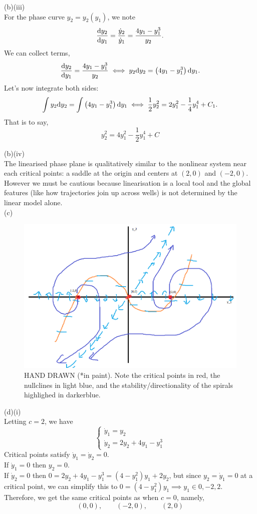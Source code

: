 \documentclass[a4paper,11pt]{report}
\begin{document}
\sol (b)(iii) \\
For the phase curve $y_2 = y_2(y_1)$, we note
$$
  \dyd[y_2]{y_1} = \frac{\dot{y}_2}{\dot{y}_1} = \frac{4y_1 - y_1^3}{y_2}.
$$
We can collect terms,
$$
 \dyd[y_2]{y_1} = \frac{4y_1 - y_1^3}{y_2} \iff y_2\d y_2 = \bracks{4y_1 - y_1^3}\d y_1.
$$
Let's now integrate both sides:
$$
 \int y_2\d y_2 = \int \bracks{4y_1 - y_1^3}\d y_1 \iff \frac{1}{2}y_2^2 = 2y_1^2 - \frac{1}{4}y_1^4 + C_1.
$$
That is to say,
$$
  y_2^2 = 4y_1^2 - \frac{1}{2}y_1^4 + C
$$

\sol(b)(iv) \\
The linearised phase plane is qualitatively similar to the nonlinear system near each critical points: a saddle at the origin and centers at $(2,0)$ and $(-2,0)$. However we must be cautious because linearisation is a local tool and the global features (like how trajectories join up across wells) is not determined by the linear model alone. \\

\clearpage
\sol(c) \\
\begin{figure}[h!]
  \begin{center}
    \includegraphics[width=5.5in]{Q1c.png}
    \caption{HAND DRAWN (*in paint). Note the critical points in red, the nullclines in light blue, and the stability/directionality of the spirals highlighed in darkerblue.}
  \end{center}
\end{figure}

\newpage
\sol(d)(i) \\
Letting $c=2$, we have
$$
  \begin{cases}
    \dot{y}_1 = y_2 \\
    \dot{y}_2 = 2y_2 + 4y_1 - y_1^3
  \end{cases}
$$
Critical points satisfy $\dot{y}_1 = \dot{y}_2 = 0$. \\
If $\dot{y}_1 = 0$ then $y_2 = 0$. \\
If $\dot{y}_2 = 0$ then $0 = 2y_2 + 4y_1 - y_1^3 = (4 - y_1^2)y_1 + 2y_2$, but since $y_2=\dot{y}_1=0$ at a critical point, we can simplify this to $0=(4-y_1^2)y_1 \implies y_1\in{0,-2,2}$. \\
Therefore, we get the same critical points as when $c=0$, namely,
$$
  (0, 0),\qquad (-2,0),\qquad (2,0)
$$
\end{document}
